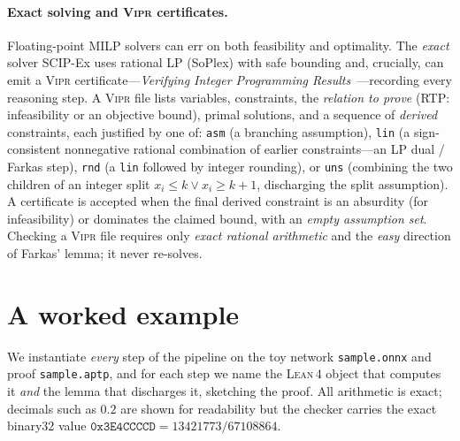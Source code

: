 \documentclass[runningheads]{llncs}
\newcommand{\vipr}{\textsc{Vipr}}
\newcommand{\scip}{\textsc{SCIP}}
\newcommand{\lean}{\textsc{Lean\,4}}
\newcommand{\code}[1]{\texttt{#1}}
\begin{document}
\paragraph{Exact solving and \vipr{} certificates.}
Floating-point MILP solvers can err on both feasibility and optimality. The
\emph{exact} solver \scip-Ex uses rational LP (SoPlex) with safe bounding and,
crucially, can emit a \vipr{} certificate---\emph{Verifying Integer Programming
Results}~\cite{cheung2017vipr,eifler2022exact}---recording every reasoning step.
A \vipr{} file lists variables, constraints, the \emph{relation to prove} (RTP:
infeasibility or an objective bound), primal solutions, and a sequence of
\emph{derived} constraints, each justified by one of: \code{asm} (a branching
assumption), \code{lin} (a sign-consistent nonnegative rational combination of
earlier constraints---an LP dual / Farkas step), \code{rnd} (a \code{lin} followed
by integer rounding), or \code{uns} (combining the two children of an integer split
$x_i\le k \lor x_i\ge k{+}1$, discharging the split assumption). A certificate is
accepted when the final derived constraint is an absurdity (for infeasibility) or
dominates the claimed bound, with an \emph{empty assumption set}. Checking a \vipr{}
file requires only \emph{exact rational arithmetic} and the \emph{easy} direction of
Farkas' lemma; it never re-solves.

\section{A worked example}\label{sec:example}

We instantiate \emph{every} step of the pipeline on the toy network
\code{sample.onnx} and proof \code{sample.aptp}, and for each step we name the \lean{}
object that computes it \emph{and} the lemma that discharges it, sketching the proof.
All arithmetic is exact; decimals such as $0.2$ are shown for readability but the
checker carries the exact binary32 value $\mathtt{0x3E4CCCCD}=13421773/67108864$.
\end{document}
